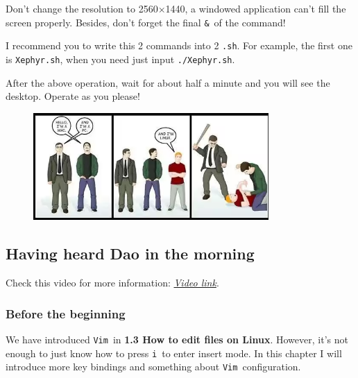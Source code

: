 \documentclass[12pt]{ctexart}
\newenvironment{mdquote}
{%
  \par\noindent
  \begin{list}{}{%
      \setlength{\leftmargin}{1em}%
      \setlength{\rightmargin}{0pt}%
      \setlength{\itemindent}{0pt}%
      \setlength{\listparindent}{\parindent}%
      \setlength{\topsep}{0.5\baselineskip}%
  }
  \item[\textbf{>}\ ]\itshape
}
{\end{list}\par}
\begin{document}
\begin{mdquote}
Don't change the resolution to 2560$\times$1440, a windowed
application can't fill the screen properly. Besides,
don't forget the final \texttt{\&}\ of the command!
\end{mdquote}

I recommend you to write this 2 commands into 2 \texttt{.sh}. For
example, the first one is \texttt{Xephyr.sh}, when you need just input
\texttt{./Xephyr.sh}.

After the above operation, wait for about half a minute and you will see
the desktop. Operate as you please!

\begin{figure}[H]
    \centering
    \includegraphics[width=0.8\textwidth,keepaspectratio]{assets/Linux/2.8 Return to Paradise/2.png}
\end{figure}

\newpage
\subsection{\textbf{Having heard Dao in the morning}}

\begin{mdquote}
Check this video for more information: \href{https://www.bilibili.com/video/BV1s4421A7he/}{\textit{Video link}}.
\end{mdquote}

\subsubsection{\textbf{Before the beginning}}

We have introduced \texttt{Vim}\ in \textbf{1.3 How to edit files on Linux}.
However, it's not enough to just know how to press \texttt{i}\ to enter
insert mode. In this chapter I will introduce more key bindings and  
something about \texttt{Vim}\ configuration.
\end{document}
